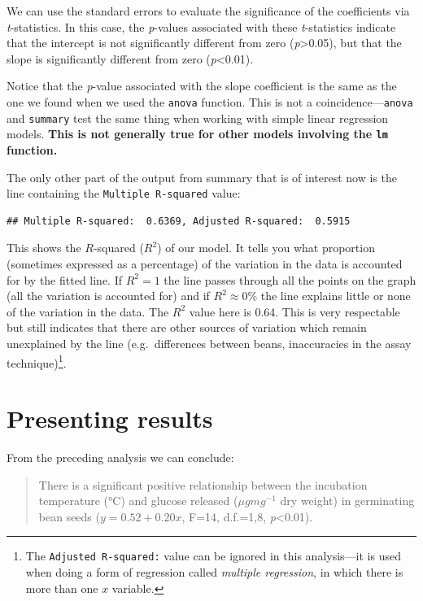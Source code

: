 \documentclass[
]{book}
\begin{document}
We can use the standard errors to evaluate the significance of the coefficients via \emph{t}-statistics. In this case, the \emph{p}-values associated with these \emph{t}-statistics indicate that the intercept is not significantly different from zero (\emph{p}\textgreater0.05), but that the slope is significantly different from zero (\emph{p}\textless0.01).

Notice that the \emph{p}-value associated with the slope coefficient is the same as the one we found when we used the \texttt{anova} function. This is not a coincidence---\texttt{anova} and \texttt{summary} test the same thing when working with simple linear regression models. \textbf{This is not generally true for other models involving the \texttt{lm} function.}

The only other part of the output from summary that is of interest now is the line containing the \texttt{Multiple\ R-squared} value:

\begin{verbatim}
## Multiple R-squared:  0.6369, Adjusted R-squared:  0.5915
\end{verbatim}

This shows the \(R\)-squared (\(R^{2}\)) of our model. It tells you what proportion (sometimes expressed as a percentage) of the variation in the data is accounted for by the fitted line. If \(R^{2}=1\) the line passes through all the points on the graph (all the variation is accounted for) and if \(R^{2}\approx 0\%\) the line explains little or none of the variation in the data. The \(R^{2}\) value here is 0.64. This is very respectable but still indicates that there are other sources of variation which remain unexplained by the line (e.g.~differences between beans, inaccuracies in the assay technique)\footnote{The \texttt{Adjusted\ R-squared:} value can be ignored in this analysis---it is used when doing a form of regression called \emph{multiple regression}, in which there is more than one \(x\) variable.}.

\hypertarget{present-results}{%
\section{Presenting results}\label{present-results}}

From the preceding analysis we can conclude:

\begin{quote}
There is a significant positive relationship between the incubation temperature (°C) and glucose released (\(\mu g mg^{-1}\) dry weight) in germinating bean seeds (\(y=0.52+0.20x\), F=14, d.f.=1,8, \emph{p}\textless0.01).
\end{quote}
\end{document}
